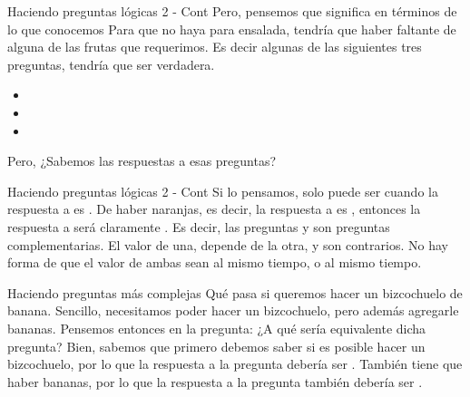 \begin{frame}{Haciendo preguntas lógicas 2 - Cont}
  Pero, pensemos que significa en términos de lo que conocemos
  \jump
  Para que no haya para ensalada, tendría que haber faltante de alguna de las
  frutas que requerimos. Es decir algunas de las siguientes tres preguntas,
  tendría que ser verdadera.
  \begin{itemize}
    \item {}
    \item {}
    \item {}
  \end{itemize}
  \jump
  Pero, ¿Sabemos las respuestas a esas preguntas?
\end{frame}


\begin{frame}{Haciendo preguntas lógicas 2 - Cont}
  Si lo pensamos,  solo
  puede ser \fulltrue cuando la respuesta a 
  es \fullfalse.
  \jump
  De haber naranjas, es decir, la respuesta a  es
  \fulltrue, entonces la respuesta a 
  será claramente \fullfalse.
  \jump
  Es decir, las preguntas  y
   son preguntas complementarias.
  El valor de una, depende de la otra, y son contrarios.
  \jump
  No hay forma de que el valor de ambas sean \fulltrue al mismo tiempo, o
  \fullfalse al mismo tiempo.
\end{frame}


\begin{frame}{Haciendo preguntas más complejas}
  Qué pasa si queremos hacer un bizcochuelo de banana. Sencillo, necesitamos
  poder hacer un bizcochuelo, pero además agregarle bananas. Pensemos entonces
  en la pregunta:
  \jump
  \jump
  ¿A qué sería equivalente dicha pregunta? Bien, sabemos que primero debemos
  saber si es posible hacer un bizcochuelo, por lo que la respuesta a
  la pregunta  debería ser
  \fulltrue. También tiene que haber bananas, por lo que la respuesta a la
  pregunta  también debería ser \fulltrue.
\end{frame}

